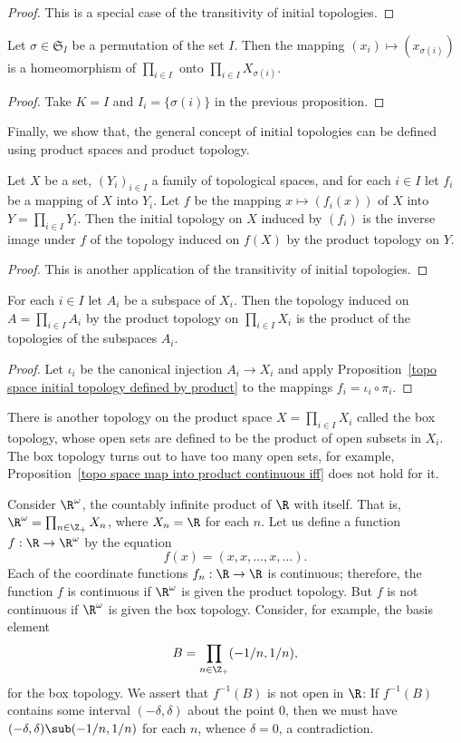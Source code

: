 \begin{proof}
This is a special case of the transitivity of initial topologies.
\end{proof}
\begin{corollary}
Let $\sigma\in\mathfrak{S}_I$ be a permutation of the set $I$. Then the mapping $(x_i)\mapsto(x_{\sigma(i)})$ is a homeomorphism of $\prod_{i\in I}$ onto $\prod_{i\in I}X_{\sigma(i)}$.
\end{corollary}
\begin{proof}
Take $K=I$ and $I_i=\{\sigma(i)\}$ in the previous proposition.
\end{proof}
Finally, we show that, the general concept of initial topologies can be defined using product spaces and product topology.
\begin{proposition}\label{topo space initial topology defined by product}
Let $X$ be a set, $(Y_i)_{i\in I}$ a family of topological spaces, and for each $i\in I$ let $f_i$ be a mapping of $X$ into $Y_i$. Let $f$ be the mapping $x\mapsto(f_i(x))$ of $X$ into $Y=\prod_{i\in I}Y_i$. Then the initial topology on $X$ induced by $(f_i)$ is the inverse image under $f$ of the topology induced on $f(X)$ by the product topology on $Y$.
\end{proposition}
\begin{proof}
This is another application of the transitivity of initial topologies.
\end{proof}
\begin{corollary}
For each $i\in I$ let $A_i$ be a subspace of $X_i$. Then the topology induced on $A=\prod_{i\in I}A_i$ by the product topology on $\prod_{i\in I}X_i$ is the product of the topologies of the subspaces $A_i$.
\end{corollary}
\begin{proof}
Let $\iota_i$ be the canonical injection $A_i\to X_i$ and apply Proposition~\ref{topo space initial topology defined by product} to the mappings $f_i=\iota_i\circ\pi_i$.
\end{proof}
There is another topology on the product space $X=\prod_{i\in I}X_i$ called the box topology, whose open sets are defined to be the product of open subsets in $X_i$. The box topology turns out to have too many open sets, for example, Proposition~\ref{topo space map into product continuous iff} does not hold for it.
\begin{example}
Consider $\R^\omega$, the countably infinite product of $\R$ with itself. That is, $\R^\omega=\prod_{n\in\Z_+}X_n$, where $X_n=\R$ for each $n$. Let us define a function $f:\R\to\R^\omega$ by the equation
\[f(x)=(x,x,\dots,x,\dots).\]
Each of the coordinate functions $f_n:\R\to\R$ is continuous; therefore, the function $f$ is continuous if $\R^\omega$ is given the product topology. But $f$ is not continuous if $\R^\omega$ is given the box topology. Consider, for example, the basis element
\[B=\prod_{n\in\Z_+}(-1/n,1/n),\]
for the box topology. We assert that $f^{-1}(B)$ is not open in $\R$: If $f^{-1}(B)$ contains some interval $(-\delta,\delta)$ about the point $0$, then we must have $(-\delta,\delta)\sub(-1/n,1/n)$ for each $n$, whence $\delta=0$, a contradiction.
\end{example}
